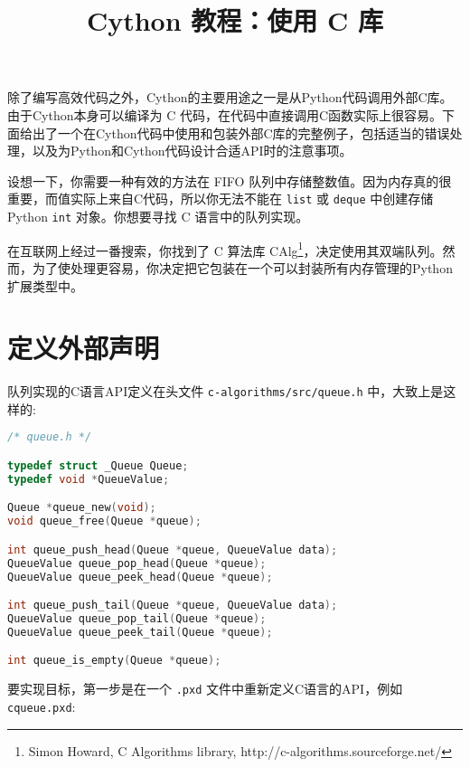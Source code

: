 
\begin{translation}
\label{cha:translation}

\title{Cython 教程：使用 C 库}
\maketitle

\tableofcontents


除了编写高效代码之外，Cython的主要用途之一是从Python代码调用外部C库。由于Cython本身可以编译为 C 代码，在代码中直接调用C函数实际上很容易。下面给出了一个在Cython代码中使用和包装外部C库的完整例子，包括适当的错误处理，以及为Python和Cython代码设计合适API时的注意事项。

设想一下，你需要一种有效的方法在 FIFO 队列中存储整数值。因为内存真的很重要，而值实际上来自C代码，所以你无法不能在 \lstinline{list} 或 \lstinline{deque} 中创建存储Python \lstinline{int} 对象。你想要寻找 C 语言中的队列实现。

在互联网上经过一番搜索，你找到了 C 算法库 CAlg\footnote{Simon Howard, C Algorithms library, http://c-algorithms.sourceforge.net/}，决定使用其双端队列。然而，为了使处理更容易，你决定把它包装在一个可以封装所有内存管理的Python扩展类型中。

\section{定义外部声明}
队列实现的C语言API定义在头文件 \lstinline{c-algorithms/src/queue.h} 中，大致上是这样的:

\begin{framed}
\begin{lstlisting}[language=c]
/* queue.h */

typedef struct _Queue Queue;
typedef void *QueueValue;

Queue *queue_new(void);
void queue_free(Queue *queue);

int queue_push_head(Queue *queue, QueueValue data);
QueueValue queue_pop_head(Queue *queue);
QueueValue queue_peek_head(Queue *queue);

int queue_push_tail(Queue *queue, QueueValue data);
QueueValue queue_pop_tail(Queue *queue);
QueueValue queue_peek_tail(Queue *queue);

int queue_is_empty(Queue *queue);
\end{lstlisting}    
\end{framed}


要实现目标，第一步是在一个 \lstinline{.pxd} 文件中重新定义C语言的API，例如 \lstinline{cqueue.pxd}:


\end{translation}
